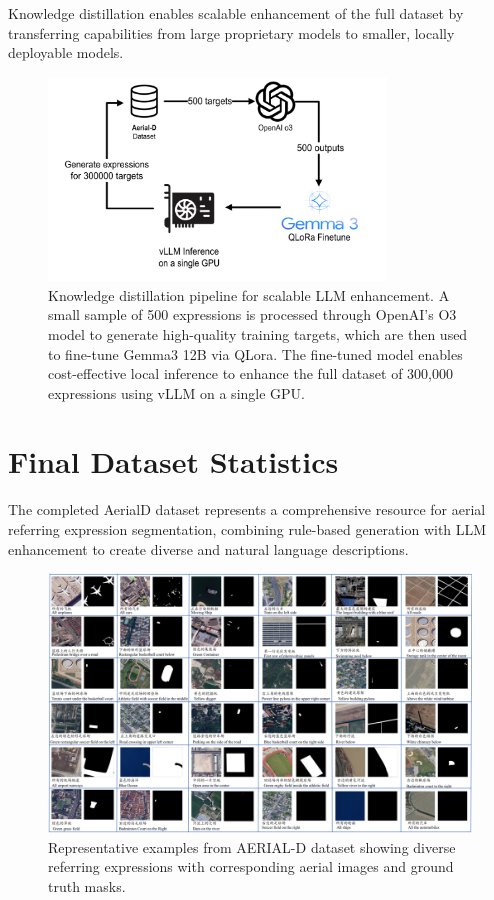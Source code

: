 Knowledge distillation enables scalable enhancement of the full dataset by transferring capabilities from large proprietary models to smaller, locally deployable models.

\begin{figure}[H]
\centering
\includegraphics[width=0.8\textwidth]{./Images/distillation.png}
\caption{Knowledge distillation pipeline for scalable LLM enhancement. A small sample of 500 expressions is processed through OpenAI's O3 model to generate high-quality training targets, which are then used to fine-tune Gemma3 12B via QLora. The fine-tuned model enables cost-effective local inference to enhance the full dataset of 300,000 expressions using vLLM on a single GPU.}
\label{fig:llm_distillation}
\end{figure}


\section{Final Dataset Statistics}

The completed AerialD dataset represents a comprehensive resource for aerial referring expression segmentation, combining rule-based generation with LLM enhancement to create diverse and natural language descriptions.

\begin{figure}[H]
\centering
\includegraphics[width=\textwidth]{./Images/dataset.png}
\caption{Representative examples from AERIAL-D dataset showing diverse referring expressions with corresponding aerial images and ground truth masks.}
\label{fig:dataset_examples}
\end{figure}

